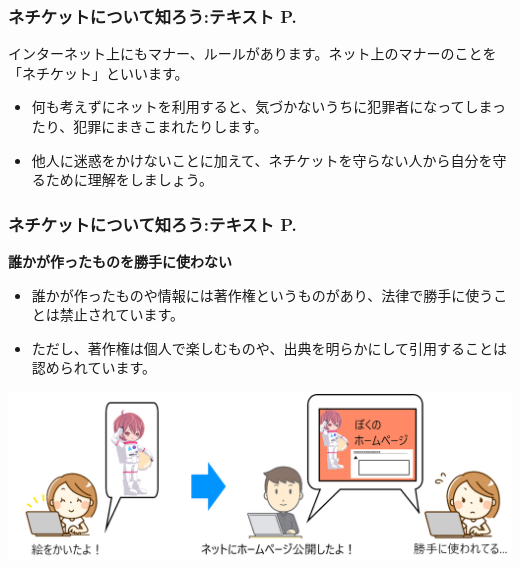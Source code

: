 \documentclass[dvipdfmx]{beamer}
\begin{document}
\begin{frame}[fragile]
	\frametitle{ネチケットについて知ろう:テキスト P.\pageref{1:P:Netiquette}~~~}
    インターネット上にもマナー、ルールがあります。ネット上のマナーのことを「ネチケット」といいます。
            \begin{itemize}
                \item 何も考えずにネットを利用すると、気づかないうちに犯罪者になってしまったり、犯罪にまきこまれたりします。
                \item 他人に迷惑をかけないことに加えて、ネチケットを守らない人から自分を守るために理解をしましょう。
            \end{itemize}
            \vfill
\end{frame}

\begin{frame}[fragile]
	\frametitle{ネチケットについて知ろう:テキスト P.\pageref{1:P:Netiquette}~~~}
    \large\textbf{誰かが作ったものを勝手に使わない}
            \begin{itemize}
                \item 誰かが作ったものや情報には著作権というものがあり、法律で勝手に使うことは禁止されています。
                \item ただし、著作権は個人で楽しむものや、出典を明らかにして引用することは認められています。
            \end{itemize}
            \vfill
            
			\begin{minipage}{\textwidth}
                {\upshape
                  \includegraphics[width=\textwidth]{slide07-img001.png}}
            \end{minipage}
\end{frame}
\end{document}
